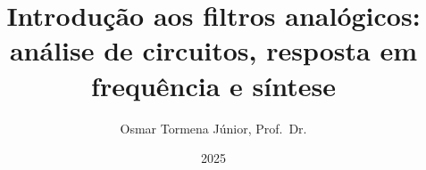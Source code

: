 \documentclass[%
	a5paper,%
	extrafontsizes,%
	oneside,%
	final%
	]{memoir}
\title{Introdução aos filtros analógicos: análise de circuitos, resposta em frequência e síntese}
\author{Osmar Tormena Júnior, Prof.\ Dr.}
\date{2025}
\begin{document}
\maketitle\clearpage

\tableofcontents*\clearpage
\listoffigures




\end{document}
